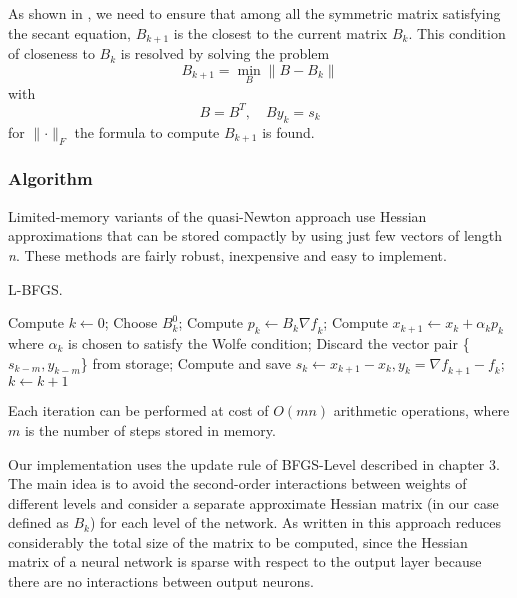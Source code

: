 As shown in \cite{numerical}, we need to ensure that among all the symmetric matrix satisfying the secant equation, $B_{k+1}$ is the closest to the current matrix $
B_{k}$. This condition of closeness to $B_{k}$ is resolved by solving the problem
\begin{equation}
B_{k+1} = \min_{B} \parallel B - B_{k} \parallel
\end{equation}
with 
\begin{equation}
B = B^T, \quad B{y_{k}}= s_{k}
\end{equation}
for $\parallel \cdot \parallel_{F} $ the formula to compute $B_{k+1}$ is found.


\subsubsection{Algorithm}
Limited-memory variants  of  the  quasi-Newton  approach use  Hessian  approximations  that  can  be stored compactly by using just few vectors of length \textit{n}. These methods are fairly robust, inexpensive and easy to implement.

\begin{algorithm}[H]
	\caption{L-BFGS.}
	\label{alg:LBFGS}
	\begin{algorithmic}[4]
		\State Compute $k \gets 0$;
		\Repeat
		\State Choose \textbf{$B^0_k$};
		\State Compute $p_k \gets B_k\nabla \textit{f}_k$;
		\State Compute $x_{k+1} \gets x_{k}+ \alpha_{k}p_{k}$ where $\alpha_{k}$ is chosen to satisfy the Wolfe condition;
		\State Discard the vector pair \{$s_{k-m},y_{k-m}$\} from storage;
		\EndIf
		\State Compute and save $s_k \gets x_{k+1}-x_{k}, y_k=\nabla \textit{f}_{k+1}-\textit{f}_k$;
		\State $k \gets k+1$
		\EndProcedure 
	\end{algorithmic}
\end{algorithm}

Each iteration can be performed at cost of $O(mn)$ arithmetic operations, where $m$ is the number of steps stored in memory.

Our implementation uses the update rule of BFGS-Level described in \cite{PaperL-BFGS-NeuralNetwork} chapter 3. The main idea is to avoid the second-order interactions between weights of different levels and consider a separate approximate Hessian matrix (in our case defined as $B_{k}$) for each level of the network. As written in \cite{PaperL-BFGS-NeuralNetwork} this approach reduces considerably the total size of the matrix to be computed, since the Hessian matrix of a neural network is sparse with respect to the output layer because there are no interactions between output neurons.

